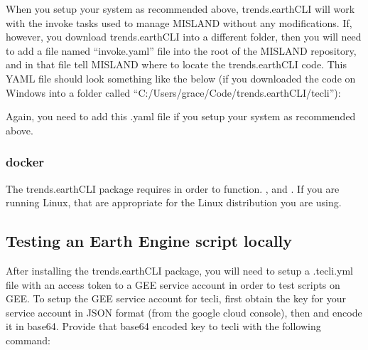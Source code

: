 \documentclass[letterpaper,10pt,english]{sphinxmanual}
\begin{document}
\sphinxAtStartPar
When you setup your system as recommended above, trends.earth\sphinxhyphen{}CLI will work
with the invoke tasks used to manage MISLAND without any modifications.
If, however, you download trends.earth\sphinxhyphen{}CLI into a different folder, then you
will need to add a file named “invoke.yaml” file into the root of the
MISLAND repository, and in that file tell MISLAND where to locate the
trends.earth\sphinxhyphen{}CLI code. This YAML file should look something like the below (if
you downloaded the code on Windows into a folder called
“C:/Users/grace/Code/trends.earth\sphinxhyphen{}CLI/tecli”):

\begin{sphinxVerbatim}[commandchars=\\\{\}]
\end{sphinxVerbatim}

\sphinxAtStartPar
Again, you  need to add this .yaml file if you setup your system as
recommended above.


\subsubsection{docker}
\label{\detokenize{Qgis_Plugin/plugin_development:docker}}
\sphinxAtStartPar
The trends.earth\sphinxhyphen{}CLI package requires  in
order to function. , and . If you are running
Linux,  that are appropriate for the Linux
distribution you are using.


\subsection{Testing an Earth Engine script locally}
\label{\detokenize{Qgis_Plugin/plugin_development:testing-an-earth-engine-script-locally}}
\sphinxAtStartPar
After installing the trends.earth\sphinxhyphen{}CLI package, you will need to setup a
.tecli.yml file with an access token to a GEE service account in order to test
scripts on GEE. To setup the GEE service account for tecli, first obtain the
key for your service account in JSON format (from the google cloud console),
then and encode it in base64. Provide that base64 encoded key to tecli with the
following command:
\end{document}
